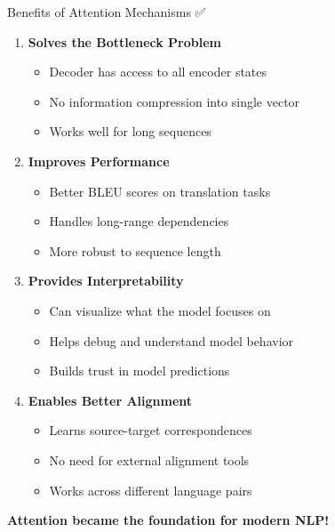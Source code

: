 \documentclass[aspectratio=169]{beamer}
\begin{document}
\begin{frame}[shrink=10]{Benefits of Attention Mechanisms ✅}
\begin{enumerate}\setlength{\itemsep}{0pt}
    \item \textbf{Solves the Bottleneck Problem}
    \begin{itemize}\setlength{\itemsep}{0pt}
        \item Decoder has access to all encoder states
        \item No information compression into single vector
        \item Works well for long sequences
    \end{itemize}

    \vspace{0.5em}

    \item \textbf{Improves Performance}
    \begin{itemize}\setlength{\itemsep}{0pt}
        \item Better BLEU scores on translation tasks
        \item Handles long-range dependencies
        \item More robust to sequence length
    \end{itemize}

    \vspace{0.5em}

    \item \textbf{Provides Interpretability}
    \begin{itemize}\setlength{\itemsep}{0pt}
        \item Can visualize what the model focuses on
        \item Helps debug and understand model behavior
        \item Builds trust in model predictions
    \end{itemize}

    \vspace{0.5em}

    \item \textbf{Enables Better Alignment}
    \begin{itemize}\setlength{\itemsep}{0pt}
        \item Learns source-target correspondences
        \item No need for external alignment tools
        \item Works across different language pairs
    \end{itemize}
\end{enumerate}

\vspace{0.5em}
\textbf{Attention became the foundation for modern NLP!}
\end{frame}
\end{document}
